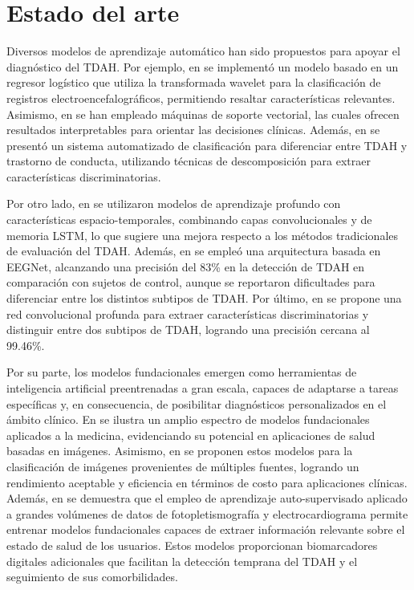 \section{Estado del arte}

Diversos modelos de aprendizaje automático han sido propuestos para apoyar el diagnóstico del TDAH. Por ejemplo, en \cite{10.1007/978-3-030-89691-1_41} se implementó un modelo basado en un regresor logístico que utiliza la transformada wavelet para la clasificación de registros electroencefalográficos, permitiendo resaltar características relevantes. Asimismo, en \cite{Vaidya202051} se han empleado máquinas de soporte vectorial, las cuales ofrecen resultados interpretables para orientar las decisiones clínicas. Además, en \cite{Tor2021} se presentó un sistema automatizado de clasificación para diferenciar entre TDAH y trastorno de conducta, utilizando técnicas de descomposición para extraer características discriminatorias.


Por otro lado, en \cite{Mao20191} se utilizaron modelos de aprendizaje profundo con características espacio-temporales, combinando capas convolucionales y de memoria LSTM, lo que sugiere una mejora respecto a los métodos tradicionales de evaluación del TDAH. Además, en \cite{Vahid2019} se empleó una arquitectura basada en EEGNet, alcanzando una precisión del 83\% en la detección de TDAH en comparación con sujetos de control, aunque se reportaron dificultades para diferenciar entre los distintos subtipos de TDAH. Por último, en \cite{AHMADI2021102227} se propone una red convolucional profunda para extraer características discriminatorias y distinguir entre dos subtipos de TDAH, logrando una precisión cercana al 99.46\%.

Por su parte, los modelos fundacionales emergen como herramientas de inteligencia artificial preentrenadas a gran escala, capaces de adaptarse a tareas específicas y, en consecuencia, de posibilitar diagnósticos personalizados en el ámbito clínico. En \cite{Zhang2024} se ilustra un amplio espectro de modelos fundacionales aplicados a la medicina, evidenciando su potencial en aplicaciones de salud basadas en imágenes. Asimismo, en \cite{Wang2023} se proponen estos modelos para la clasificación de imágenes provenientes de múltiples fuentes, logrando un rendimiento aceptable y eficiencia en términos de costo para aplicaciones clínicas. Además, en \cite{Abbaspourazad2024} se demuestra que el empleo de aprendizaje auto-supervisado aplicado a grandes volúmenes de datos de fotopletismografía y electrocardiograma permite entrenar modelos fundacionales capaces de extraer información relevante sobre el estado de salud de los usuarios. Estos modelos proporcionan biomarcadores digitales adicionales que facilitan la detección temprana del TDAH y el seguimiento de sus comorbilidades.

